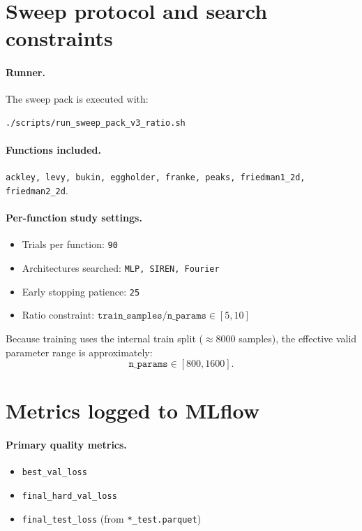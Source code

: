 \section{Sweep protocol and search constraints}

\paragraph{Runner.}
The sweep pack is executed with:
\begin{verbatim}
./scripts/run_sweep_pack_v3_ratio.sh
\end{verbatim}

\paragraph{Functions included.}
\texttt{ackley, levy, bukin, eggholder, franke, peaks, friedman1\_2d, friedman2\_2d}.

\paragraph{Per-function study settings.}
\begin{itemize}
    \item Trials per function: \texttt{90}
    \item Architectures searched: \texttt{MLP, SIREN, Fourier}
    \item Early stopping patience: \texttt{25}
    \item Ratio constraint: \(\texttt{train\_samples} / \texttt{n\_params} \in [5, 10]\)
\end{itemize}

Because training uses the internal train split (\(\approx 8000\) samples), the
effective valid parameter range is approximately:
\[
    \texttt{n\_params} \in [800, 1600].
\]

\section{Metrics logged to MLflow}

\paragraph{Primary quality metrics.}
\begin{itemize}
    \item \texttt{best\_val\_loss}
    \item \texttt{final\_hard\_val\_loss}
    \item \texttt{final\_test\_loss} (from \texttt{*\_test.parquet})
\end{itemize}

